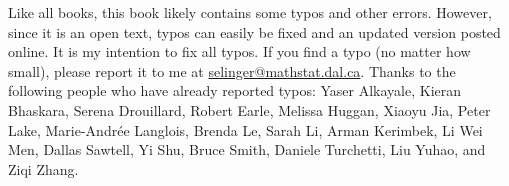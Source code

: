 Like all books, this book likely contains some typos and other
errors. However, since it is an open text, typos can easily be fixed
and an updated version posted online. It is my intention to fix all
typos. If you find a typo (no matter how small), please report it to
me at
\href{mailto:selinger@mathstat.dal.ca}{selinger@mathstat.dal.ca}. Thanks
to the following people who have already reported typos: Yaser
Alkayale, Kieran Bhaskara, Serena Drouillard, Robert Earle, Melissa Huggan,
Xiaoyu Jia, Peter Lake, Marie-Andr\'ee Langlois, Brenda Le, Sarah Li, Arman
Kerimbek, Li Wei Men, Dallas Sawtell, Yi Shu, Bruce Smith, Daniele
Turchetti, Liu Yuhao, and Ziqi Zhang.
